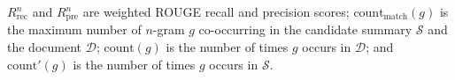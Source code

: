 \documentclass[11pt,a4paper]{article}
\begin{document}
\noindent $R_{\mathrm{rec}}^n$ and $R_{\mathrm{pre}}^n$ are weighted ROUGE recall and precision scores; $\text{count}_{\text{match}}(g)$ is the maximum number of $n$-gram $g$ co-occurring in the candidate summary $\mathcal{S}$ and the document $\mathcal{D}$; $\text{count}(g)$ is the number of times $g$ occurs in $\mathcal{D}$; and $\text{count}'(g)$ is the number of times $g$ occurs in $\mathcal{S}$.






\appendix
\end{document}
